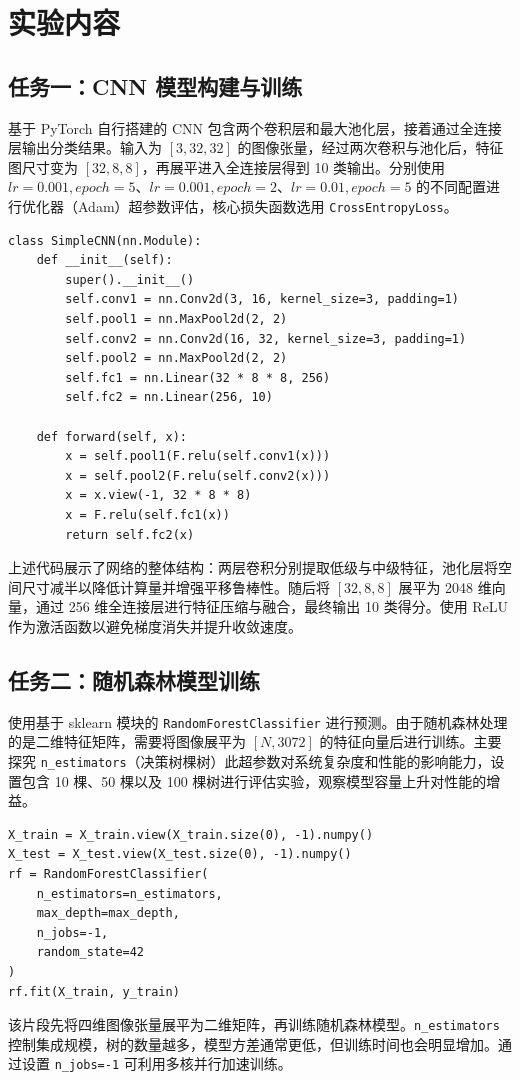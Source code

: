 \documentclass[runningheads]{ctexart}
\begin{document}
\section{实验内容}
\subsection{任务一：CNN 模型构建与训练}
基于 PyTorch 自行搭建的 CNN 包含两个卷积层和最大池化层，接着通过全连接层输出分类结果。输入为 $[3, 32, 32]$ 的图像张量，经过两次卷积与池化后，特征图尺寸变为 $[32, 8, 8]$，再展平进入全连接层得到 10 类输出。分别使用 $lr=0.001, epoch=5$、$lr=0.001, epoch=2$、$lr=0.01, epoch=5$ 的不同配置进行优化器（Adam）超参数评估，核心损失函数选用 \texttt{CrossEntropyLoss}。

\begin{lstlisting}
class SimpleCNN(nn.Module):
    def __init__(self):
        super().__init__()
        self.conv1 = nn.Conv2d(3, 16, kernel_size=3, padding=1)
        self.pool1 = nn.MaxPool2d(2, 2)
        self.conv2 = nn.Conv2d(16, 32, kernel_size=3, padding=1)
        self.pool2 = nn.MaxPool2d(2, 2)
        self.fc1 = nn.Linear(32 * 8 * 8, 256)
        self.fc2 = nn.Linear(256, 10)

    def forward(self, x):
        x = self.pool1(F.relu(self.conv1(x)))
        x = self.pool2(F.relu(self.conv2(x)))
        x = x.view(-1, 32 * 8 * 8)
        x = F.relu(self.fc1(x))
        return self.fc2(x)
\end{lstlisting}
    上述代码展示了网络的整体结构：两层卷积分别提取低级与中级特征，池化层将空间尺寸减半以降低计算量并增强平移鲁棒性。随后将 $[32, 8, 8]$ 展平为 2048 维向量，通过 256 维全连接层进行特征压缩与融合，最终输出 10 类得分。使用 ReLU 作为激活函数以避免梯度消失并提升收敛速度。

\subsection{任务二：随机森林模型训练}
使用基于 sklearn 模块的 \texttt{RandomForestClassifier} 进行预测。由于随机森林处理的是二维特征矩阵，需要将图像展平为 $[N, 3072]$ 的特征向量后进行训练。主要探究 \texttt{n\_estimators}（决策树棵树）此超参数对系统复杂度和性能的影响能力，设置包含 10 棵、50 棵以及 100 棵树进行评估实验，观察模型容量上升对性能的增益。

\begin{lstlisting}
X_train = X_train.view(X_train.size(0), -1).numpy()
X_test = X_test.view(X_test.size(0), -1).numpy()
rf = RandomForestClassifier(
    n_estimators=n_estimators,
    max_depth=max_depth,
    n_jobs=-1,
    random_state=42
)
rf.fit(X_train, y_train)
\end{lstlisting}
该片段先将四维图像张量展平为二维矩阵，再训练随机森林模型。\texttt{n\_estimators} 控制集成规模，树的数量越多，模型方差通常更低，但训练时间也会明显增加。通过设置 \texttt{n\_jobs=-1} 可利用多核并行加速训练。
\end{document}
